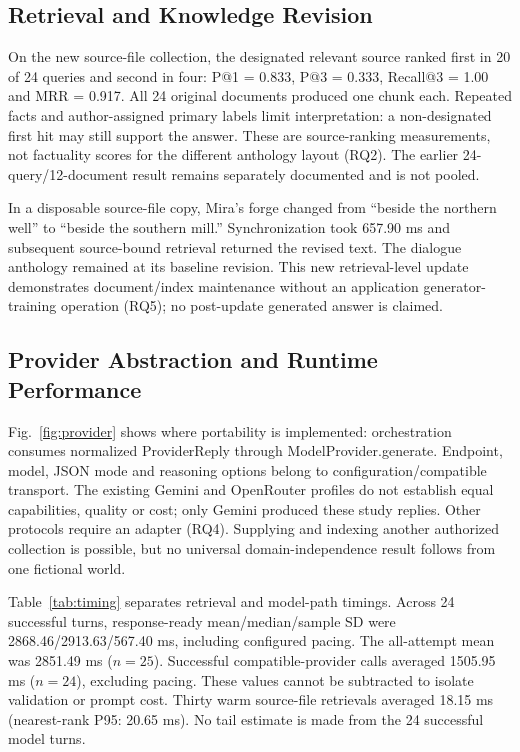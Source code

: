 \documentclass[conference]{IEEEtran}
\begin{document}
\subsection{Retrieval and Knowledge Revision}
On the new source-file collection, the designated relevant source ranked first in 20 of 24 queries and second in four: P@1 = 0.833, P@3 = 0.333, Recall@3 = 1.00 and MRR = 0.917. All 24 original documents produced one chunk each. Repeated facts and author-assigned primary labels limit interpretation: a non-designated first hit may still support the answer. These are source-ranking measurements, not factuality scores for the different anthology layout (RQ2). The earlier 24-query/12-document result remains separately documented and is not pooled.

In a disposable source-file copy, Mira's forge changed from ``beside the northern well'' to ``beside the southern mill.'' Synchronization took 657.90 ms and subsequent source-bound retrieval returned the revised text. The dialogue anthology remained at its baseline revision. This new retrieval-level update demonstrates document/index maintenance without an application generator-training operation (RQ5); no post-update generated answer is claimed.

\subsection{Provider Abstraction and Runtime Performance}
Fig.~\ref{fig:provider} shows where portability is implemented: orchestration consumes normalized ProviderReply through ModelProvider.generate. Endpoint, model, JSON mode and reasoning options belong to configuration/compatible transport. The existing Gemini and OpenRouter profiles do not establish equal capabilities, quality or cost; only Gemini produced these study replies. Other protocols require an adapter (RQ4). Supplying and indexing another authorized collection is possible, but no universal domain-independence result follows from one fictional world.

Table~\ref{tab:timing} separates retrieval and model-path timings. Across 24 successful turns, response-ready mean/median/sample SD were 2868.46/2913.63/567.40 ms, including configured pacing. The all-attempt mean was 2851.49 ms ($n=25$). Successful compatible-provider calls averaged 1505.95 ms ($n=24$), excluding pacing. These values cannot be subtracted to isolate validation or prompt cost. Thirty warm source-file retrievals averaged 18.15 ms (nearest-rank P95: 20.65 ms). No tail estimate is made from the 24 successful model turns.
\end{document}
